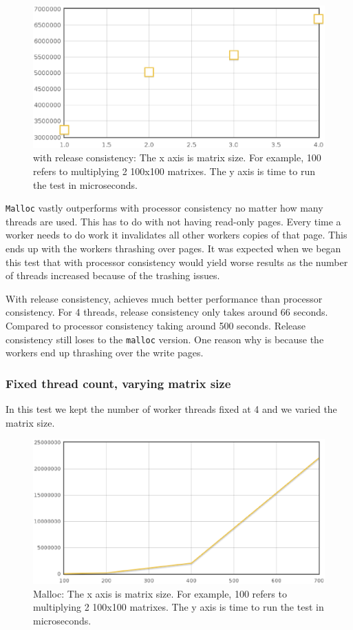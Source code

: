 \begin{figure}[!h]
\centering
\includegraphics[scale=0.40]{images/mmlh-fixed-size.eps}
\caption{\projname{} with release consistency: The x axis is matrix size. For example, 100 refers to multiplying 2 100x100 matrixes. The y axis is time to run the test in microseconds.}
\end{figure}

\verb,Malloc, vastly outperforms \projname{} with processor consistency no matter how many threads are used.  This has to do with not having read-only pages.  Every time a worker needs to do work it invalidates all other workers copies of that page.  This ends up with the workers thrashing over pages.  It was expected when we began this test that \projname{} with processor consistency would yield worse results as the number of threads increased because of the trashing issues.

With release consistency, \projname{} achieves much better performance than processor consistency.  For 4 threads, release consistency only takes around 66 seconds.  Compared to processor consistency taking around 500 seconds.  Release consistency still loses to the \verb,malloc, version.  One reason why is because the workers end up thrashing over the write pages.

\subsubsection{Fixed thread count, varying matrix size}

In this test we kept the number of worker threads fixed at 4 and we varied the matrix size.

\begin{figure}[!h]
\centering
\includegraphics[scale=0.40]{images/malloc-fixed-thread.eps}
\caption{Malloc: The x axis is matrix size. For example, 100 refers to multiplying 2 100x100 matrixes. The y axis is time to run the test in microseconds.}
\end{figure}

